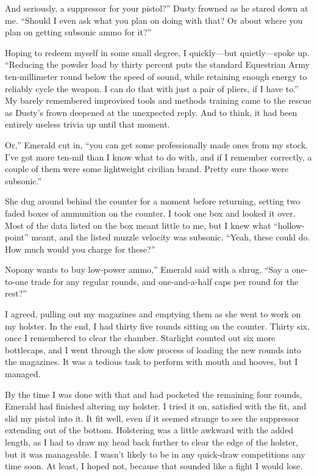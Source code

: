 \leavevmode{}And seriously, a suppressor for your pistol?” Dusty frowned as he stared down at me. “Should I even ask what you plan on doing with that? Or about where you plan on getting subsonic ammo for it?”

Hoping to redeem myself in some small degree, I quickly—but quietly—spoke up. “Reducing the powder load by thirty percent puts the standard Equestrian Army ten-millimeter round below the speed of sound, while retaining enough energy to reliably cycle the weapon. I can do that with just a pair of pliers, if I have to.” My barely remembered improvised tools and methods training came to the rescue as Dusty’s frown deepened at the unexpected reply. And to think, it had been entirely useless trivia up until that moment.

\leavevmode{}Or,” Emerald cut in, “you can get some professionally made ones from my stock. I’ve got more ten-mil than I know what to do with, and if I remember correctly, a couple of them were some lightweight civilian brand. Pretty sure those were subsonic.”

She dug around behind the counter for a moment before returning, setting two faded boxes of ammunition on the counter. I took one box and looked it over. Most of the data listed on the box meant little to me, but I knew what “hollow-point” meant, and the listed muzzle velocity was subsonic. “Yeah, these could do. How much would you charge for these?”

\leavevmode{}Nopony wants to buy low-power ammo,” Emerald said with a shrug. “Say a one-to-one trade for any regular rounds, and one-and-a-half caps per round for the rest?”

I agreed, pulling out my magazines and emptying them as she went to work on my holster. In the end, I had thirty five rounds sitting on the counter. Thirty six, once I remembered to clear the chamber. Starlight counted out six more bottlecaps, and I went through the slow process of loading the new rounds into the magazines. It was a tedious task to perform with mouth and hooves, but I managed.

By the time I was done with that and had pocketed the remaining four rounds, Emerald had finished altering my holster. I tried it on, satisfied with the fit, and slid my pistol into it. It fit well, even if it seemed strange to see the suppressor extending out of the bottom. Holstering was a little awkward with the added length, as I had to draw my head back further to clear the edge of the holster, but it was manageable. I wasn’t likely to be in any quick-draw competitions any time soon. At least, I hoped not, because that sounded like a fight I would lose.

